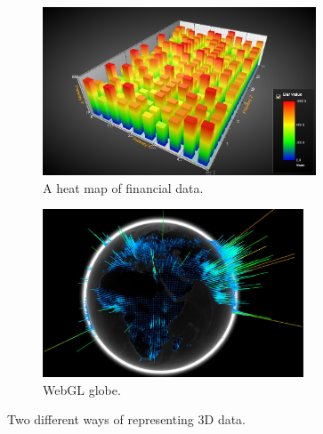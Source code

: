 
\begin{figure}[H]
    \newcommand{\figurewidth}{0.5\textwidth}
    \newcommand{\figureheight}{5cm}
	\begin{subfigure}[b]{\figurewidth}
        \includegraphics[width=\textwidth,height=\figureheight]{images/introduction/financial}
        \caption{A heat map of financial data. \protect\footnotemark}
        \label{fig:heat_map_financial}
    \end{subfigure}
    \begin{subfigure}[b]{\figurewidth}
        \includegraphics[width=\textwidth,height=\figureheight]{images/introduction/globe}
        \caption{WebGL globe. \protect\footnotemark}
        \label{fig:webgl_globe}
    \end{subfigure}
	\caption[3D representations]{Two different ways of representing 3D data.}
	\label{fig:3d_representations}
\end{figure}

\addtocounter{footnote}{-2}
